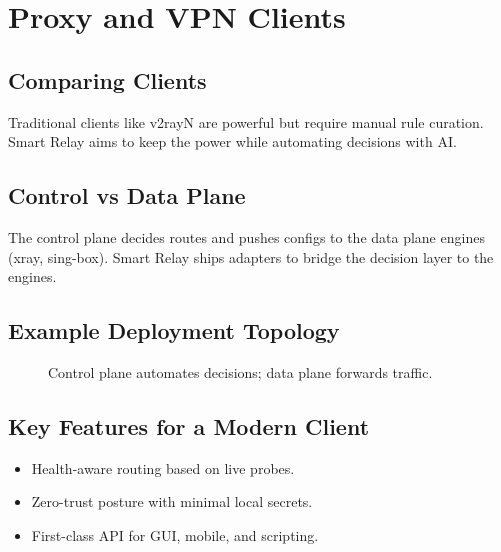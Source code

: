 \chapter{Proxy and VPN Clients}

\section{Comparing Clients}
Traditional clients like v2rayN are powerful but require manual rule curation. Smart Relay aims to keep the power while automating decisions with AI.

\section{Control vs Data Plane}
The control plane decides routes and pushes configs to the data plane engines (xray, sing-box). Smart Relay ships adapters to bridge the decision layer to the engines.

\section{Example Deployment Topology}
\begin{figure}[h]
    \centering
    \caption{Control plane automates decisions; data plane forwards traffic.}
\end{figure}

\section{Key Features for a Modern Client}
\begin{itemize}
    \item Health-aware routing based on live probes.
    \item Zero-trust posture with minimal local secrets.
    \item First-class API for GUI, mobile, and scripting.
\end{itemize}

